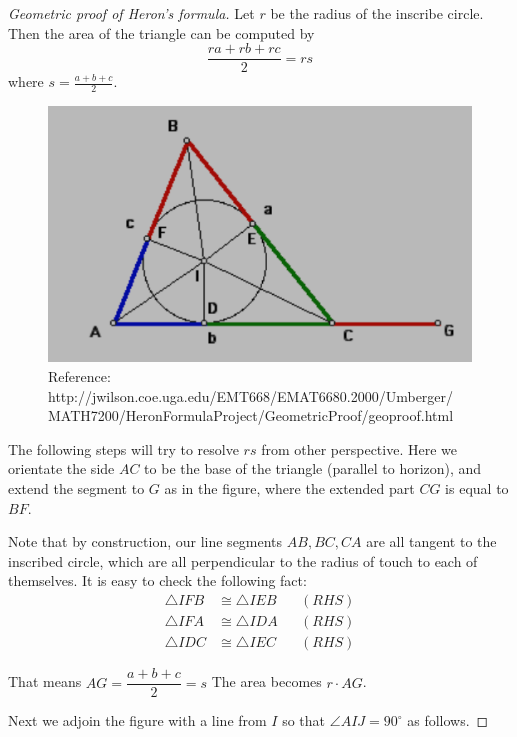 \documentclass[12pt]{article}
\begin{document}
    \begin{proof}[Geometric proof of Heron's formula]
        Let $r$ be the radius of the inscribe circle. Then the area of the triangle can be computed by $$\frac{ra+rb+rc}{2}=rs$$ where $s=\frac{a+b+c}{2}$. 

        \begin{figure}[H]
            \centering
            \includegraphics[scale=1.8]{heron.png}
            \caption{Reference: http://jwilson.coe.uga.edu/EMT668/EMAT6680.2000/Umberger/\\MATH7200/HeronFormulaProject/GeometricProof/geoproof.html}
        \end{figure}

        The following steps will try to resolve $rs$ from other perspective. Here we orientate the side $AC$ to be the base of the triangle (parallel to horizon), and extend the segment to $G$ as in the figure, where the extended part $CG$ is equal to $BF$.
        
        Note that by construction, our line segments $AB,BC,CA$ are all tangent to the inscribed circle, which are all perpendicular to the radius of touch to each of themselves. It is easy to check the following fact:\begin{align*}
            \triangle IFB &\cong \triangle IEB &&(RHS)\\
            \triangle IFA &\cong \triangle IDA &&(RHS)\\
            \triangle IDC &\cong \triangle IEC &&(RHS)
        \end{align*}
        
        That means $AG=\dfrac{a+b+c}{2}=s$ The area becomes $r\cdot AG$.

        Next we adjoin the figure with a line from $I$ so that $\angle AIJ = 90^\circ$ as follows.


\end{proof}
\end{document}
